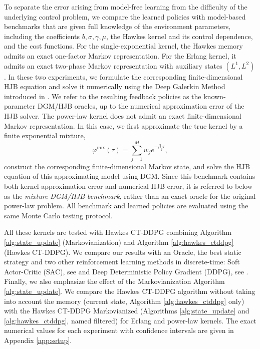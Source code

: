 \documentclass[11pt]{article}
\theoremstyle{remarkitalic}
\theoremstyle{remarkitalic}
\newcommand{\1}{\mathbf 1}
\begin{document}
To separate the error arising from model-free learning from the
difficulty of the underlying control problem, we compare the learned
policies with model-based benchmarks that are given full knowledge of
the environment parameters, including the coefficients
\(b,\sigma,\gamma,\mu\), the Hawkes kernel and its control dependence,
and the cost functions. For the single-exponential kernel, the Hawkes
memory admits an exact one-factor Markov representation. For the Erlang
kernel, it admits an exact two-phase Markov representation with
auxiliary states \((L^1,L^2)\). In these two experiments, we formulate
the corresponding finite-dimensional HJB equation and solve it
numerically using the Deep Galerkin Method introduced in \cite{Sirignano_2018}. We refer to the
resulting feedback policies as the known-parameter DGM/HJB oracles,
up to the numerical approximation error of the HJB solver. The power-law kernel does not admit an exact finite-dimensional Markov
representation. In this case, we first approximate the true kernel by
a finite exponential mixture,
\[
    \varphi^{\mathrm{mix}}(\tau)
    =
    \sum_{j=1}^{M}
    w_j e^{-\beta_j\tau},
\]
construct the corresponding finite-dimensional Markov state, and solve
the HJB equation of this approximating model using DGM. Since this
benchmark contains both kernel-approximation error and numerical HJB
error, it is referred to below as the \emph{mixture DGM/HJB benchmark},
rather than an exact oracle for the original power-law problem. All
benchmark and learned policies are evaluated using the same Monte
Carlo testing protocol.

All these kernels are tested with Hawkes CT-DDPG combining Algorithm \ref{alg:state_update} (Markovianization) and Algorithm \ref{alg:hawkes_ctddpg} (Hawkes CT-DDPG). We compare our results with an Oracle, the best static strategy and two other reinforcement learning methods in discrete-time: Soft Actor-Critic (SAC), see \cite{haarnoja2018soft} and Deep Deterministic Policy Gradient (DDPG), see \cite{silver2014deterministic}. Finally, we also emphasize the effect of the Markovianization Algorithm \ref{alg:state_update}. We compare the Hawkes CT-DDPG algorithm without taking into account the memory (current state, Algorithm \ref{alg:hawkes_ctddpg} only) with the Hawkes CT-DDPG Markovianized (Algorithms \ref{alg:state_update} and \ref{alg:hawkes_ctddpg}, named filtered) for Erlang and power-law kernels. The exact numerical values for each experiment with confidence intervals are given in Appendix \ref{app:setup}.
\end{document}
